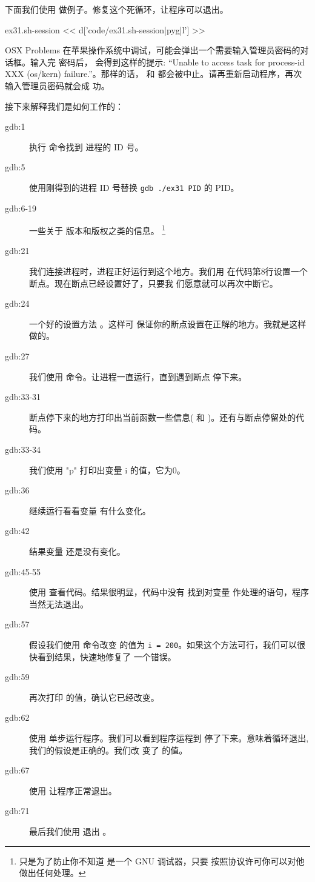 \begin{enumerate}
下面我们使用  做例子。修复这个死循环，让程序可以退出。
\begin{code}{ex31.sh-session}
<< d['code/ex31.sh-session|pyg|l'] >>
\end{code}

\begin{aside}{OSX Problems}
在苹果操作系统中调试，可能会弹出一个需要输入管理员密码的对话框。输入完
密码后，  会得到这样的提示: “Unable to access task for
process-id XXX (os/kern) failure.”。那样的话， 和
 都会被中止。请再重新启动程序，再次输入管理员密码就会成
功。
\end{aside}

接下来解释我们是如何工作的：

\begin{description}
\item[gdb:1] 执行  命令找到  进程的 ID 号。
\item[gdb:5] 使用刚得到的进程 ID 号替换 \verb|gdb ./ex31 PID| 的 PID。
\item[gdb:6-19] 一些关于  版本和版权之类的信息。
  \footnote{只是为了防止你不知道  是一个 GNU 调试器，只要
    按照协议许可你可以对他做出任何处理。}
\item[gdb:21] 我们连接进程时，进程正好运行到这个地方。我们用
   在代码第8行设置一个断点。现在断点已经设置好了，只要我
  们愿意就可以再次中断它。
\item[gdb:24] 一个好的设置方法 。这样可
  保证你的断点设置在正解的地方。我就是这样做的。
\item[gdb:27] 我们使用  命令。让进程一直运行，直到遇到断点
  停下来。
\item[gdb:33-31] 断点停下来的地方打印出当前函数一些信息(
  和 )。还有与断点停留处的代码。
\item[gdb:33-34] 我们使用  "p" 打印出变量 i 的值，它为0。
\item[gdb:36] 继续运行看看变量  有什么变化。
\item[gdb:42] 结果变量  还是没有变化。
\item[gdb:45-55] 使用  查看代码。结果很明显，代码中没有
  找到对变量  作处理的语句，程序当然无法退出。
\item[gdb:57] 假设我们使用  命令改变  的值为
  \verb|i = 200|。如果这个方法可行，我们可以很快看到结果，快速地修复了
  一个错误。
\item[gdb:59] 再次打印  的值，确认它已经改变。
\item[gdb:62] 使用  单步运行程序。我们可以看到程序运程到
   停了下来。意味着循环退出,我们的假设是正确的。我们改
  变了  的值。
\item[gdb:67] 使用 让程序正常退出。
\item[gdb:71] 最后我们使用  退出 。
\end{description}



\end{enumerate}
